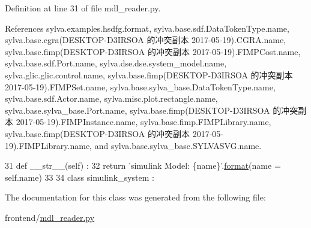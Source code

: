 Definition at line 31 of file mdl\+\_\+reader.\+py.



References sylva.\+examples.\+hsdfg.\+format, sylva.\+base.\+sdf.\+Data\+Token\+Type.\+name, sylva.\+base.\+cgra(\+D\+E\+S\+K\+T\+O\+P-\/\+D3\+I\+R\+S\+O\+A 的冲突副本 2017-\/05-\/19).\+C\+G\+R\+A.\+name, sylva.\+base.\+fimp(\+D\+E\+S\+K\+T\+O\+P-\/\+D3\+I\+R\+S\+O\+A 的冲突副本 2017-\/05-\/19).\+F\+I\+M\+P\+Cost.\+name, sylva.\+base.\+sdf.\+Port.\+name, sylva.\+dse.\+dse.\+system\+\_\+model.\+name, sylva.\+glic.\+glic.\+control.\+name, sylva.\+base.\+fimp(\+D\+E\+S\+K\+T\+O\+P-\/\+D3\+I\+R\+S\+O\+A 的冲突副本 2017-\/05-\/19).\+F\+I\+M\+P\+Set.\+name, sylva.\+base.\+sylva\+\_\+base.\+Data\+Token\+Type.\+name, sylva.\+base.\+sdf.\+Actor.\+name, sylva.\+misc.\+plot.\+rectangle.\+name, sylva.\+base.\+sylva\+\_\+base.\+Port.\+name, sylva.\+base.\+fimp(\+D\+E\+S\+K\+T\+O\+P-\/\+D3\+I\+R\+S\+O\+A 的冲突副本 2017-\/05-\/19).\+F\+I\+M\+P\+Instance.\+name, sylva.\+base.\+fimp.\+F\+I\+M\+P\+Library.\+name, sylva.\+base.\+fimp(\+D\+E\+S\+K\+T\+O\+P-\/\+D3\+I\+R\+S\+O\+A 的冲突副本 2017-\/05-\/19).\+F\+I\+M\+P\+Library.\+name, and sylva.\+base.\+sylva\+\_\+base.\+S\+Y\+L\+V\+A\+S\+V\+G.\+name.


\begin{DoxyCode}
31     \textcolor{keyword}{def }\_\_str\_\_(self) :
32       \textcolor{keywordflow}{return} \textcolor{stringliteral}{'simulink Model: \{name\}'}.\hyperlink{namespacesylva_1_1examples_1_1hsdfg_ab3510a0b8457362330aa4d9fd2209590}{format}(name = self.name)
33 
34   \textcolor{keyword}{class }simulink\_system :
\end{DoxyCode}


The documentation for this class was generated from the following file\+:\begin{DoxyCompactItemize}
\item 
frontend/\hyperlink{mdl__reader_8py}{mdl\+\_\+reader.\+py}\end{DoxyCompactItemize}
